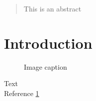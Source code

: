 \begin{abstract}
This is an abstract
\end{abstract}

\section{Introduction}

\begin{figure}[h]
	\centering
	\caption[short caption]{Image caption}
	\label{fig:}
\end{figure}

Text\\

Reference \ref{fig:}\\
